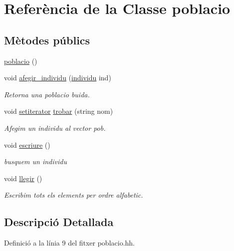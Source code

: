 \hypertarget{classpoblacio}{}\section{Referència de la Classe poblacio}
\label{classpoblacio}
\subsection*{Mètodes públics}
\begin{DoxyCompactItemize}
\item 
\hyperlink{classpoblacio_a8d6ad7ce285dd47c9cfd806e302d7086}{poblacio} ()
\item 
void \hyperlink{classpoblacio_af65ac83de2f5ac5a9b72895064ff790c}{afegir\+\_\+individu} (\hyperlink{classindividu}{individu} ind)
\begin{DoxyCompactList}\small\item\em Retorna una poblacio buida. \end{DoxyCompactList}\item 
void \hyperlink{individu_8hh_a32dbccbf05588c8c12b0111d5c5c6eb3}{setiterator} \hyperlink{classpoblacio_a55c390bc971aaf27d410960dd954066b}{trobar} (string nom)
\begin{DoxyCompactList}\small\item\em Afegim un individu al vector pob. \end{DoxyCompactList}\item 
void \hyperlink{classpoblacio_aef82aca848d299bc5eff6d6b479a5081}{escriure} ()
\begin{DoxyCompactList}\small\item\em busquem un individu \end{DoxyCompactList}\item 
void \hyperlink{classpoblacio_a0fbbb44255553f61cf18af398ad92061}{llegir} ()
\begin{DoxyCompactList}\small\item\em Escribim tots els elements per ordre alfabetic. \end{DoxyCompactList}\end{DoxyCompactItemize}


\subsection{Descripció Detallada}


Definició a la línia 9 del fitxer poblacio.\+hh.



